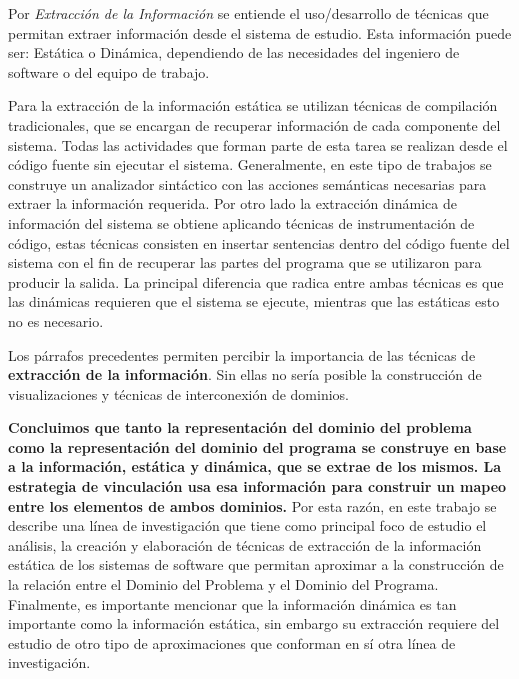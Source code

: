\documentclass[12pt]{report}
\begin{document}
Por \textit{Extracción de la Información} se entiende el uso/desarrollo de técnicas que 
permitan extraer información desde el sistema de estudio. 
Esta información puede ser: Estática o Dinámica, dependiendo de las necesidades del 
ingeniero de software o del equipo de trabajo.

Para la extracción de la información estática se utilizan técnicas de compilación tradicionales, que se encargan de recuperar información de cada componente del sistema. Todas las actividades que forman parte de esta tarea se realizan desde el código fuente sin ejecutar el sistema. Generalmente, en este tipo de trabajos se construye un analizador sintáctico con las acciones semánticas necesarias para extraer la información requerida.
Por otro lado la extracción dinámica de información del sistema se obtiene  
aplicando técnicas de instrumentación de código, estas técnicas consisten en insertar sentencias dentro del código fuente del sistema con el fin de recuperar las partes del programa que se utilizaron para 
producir la salida. 
La principal diferencia que radica entre ambas técnicas es que las dinámicas requieren que el sistema se ejecute, mientras que las estáticas esto no es necesario.

Los párrafos precedentes permiten percibir la importancia de las técnicas de 
\textbf{extracción de la información}. 
Sin ellas no sería posible la construcción de visualizaciones y técnicas de 
interconexión de dominios\cite{BRM10}. 

\textbf{Concluimos que tanto la representación del dominio del problema como la representación del dominio del programa se construye en base a la información, estática y dinámica, que se extrae de los mismos. 
La estrategia de vinculación usa esa información para construir un mapeo entre los elementos de ambos dominios.}
Por esta razón, en este trabajo se describe una línea de investigación que tiene 
como principal foco de estudio el análisis, la creación y elaboración de técnicas de extracción de la información estática de los sistemas de software que permitan aproximar a la construcción de la relación entre el Dominio del Problema y el Dominio del Programa.
Finalmente, es importante mencionar que la información dinámica es tan importante como la información estática, sin embargo su extracción requiere del estudio de otro tipo de aproximaciones que conforman en sí otra línea de investigación.
\end{document}
